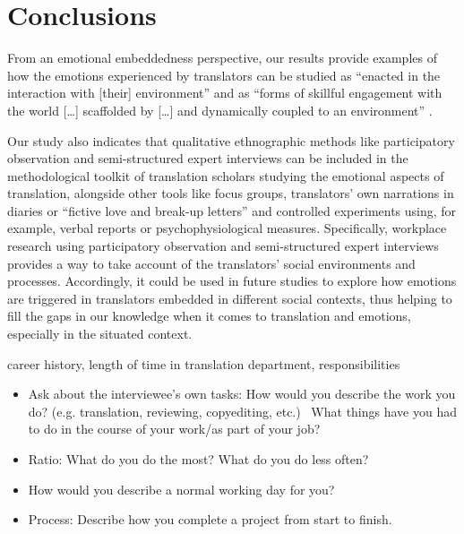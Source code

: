 \documentclass[output=paper]{langscibook}
\begin{document}
\section{Conclusions}
From an emotional embeddedness perspective, our results provide examples of how the emotions experienced by translators can be studied as “enacted in the interaction with [their] environment” \citep[285]{Wilutzky2011} and as “forms of skillful engagement with the world […] scaffolded by […] and dynamically coupled to an environment” \citep[438]{Griffiths2009}.

Our study also indicates that qualitative ethnographic methods like participatory observation and semi-structured expert interviews can be included in the methodological toolkit of translation scholars studying the emotional aspects of translation, alongside other tools like focus groups, translators’ own narrations in diaries or ``fictive love and break-up letters'' \citep{Ruokonen2017} and controlled experiments using, for example, verbal reports or psychophysiological measures. Specifically, workplace research using participatory observation and semi-structured expert interviews provides a way to take account of the translators’ social environments and processes. Accordingly, it could be used in future studies to explore how emotions are triggered in translators embedded in different social contexts, thus helping to fill the gaps in our knowledge when it comes to translation and emotions, especially in the situated context.


\label{sec:10:appendix}

 career history, length of time in translation department, responsibilities


\begin{itemize}
\itemsep0em
    \item Ask about the interviewee’s own tasks: How would you describe the work you do? (e.g. translation, reviewing, copyediting, etc.) \rightarrow ~What things have you had to do in the course of your work/as part of your job?
    \item Ratio: What do you do the most? What do you do less often?
    \item How would you describe a normal working day for you?
    \item Process: Describe how you complete a project from start to finish.
\end{itemize}
\end{document}
